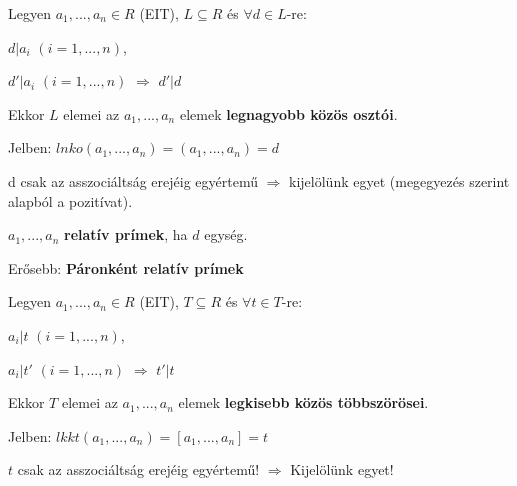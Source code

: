 \begin{frame}
  \begin{tcolorbox}[title={Def.: Legnagyobb közös osztó}]
      Legyen $a_1, ..., a_n \in R$ (EIT), $L \subseteq R $ és ${\forall}d \in L$-re:\\
      \mmedskip

      $d|a_i$ $(i = 1, ..., n)$,\\
      \mmedskip

      $d' | a_i$ $(i = 1, ..., n)$ $\Rightarrow$ $d'|d$\\
      \mmedskip

      Ekkor $L$ elemei az $a_1, ..., a_n$ elemek \textbf{legnagyobb közös osztói}.\\
      \mmedskip

      Jelben: $lnko(a_1, ..., a_n) = (a_1, ..., a_n) = d$\\
      \mmedskip

      d csak az asszociáltság erejéig egyértemű $\Rightarrow$ kijelölünk egyet (megegyezés szerint alapból a pozitívat).
  \end{tcolorbox}

  \begin{tcolorbox}[title={Def.: Relatív prím, Páronként relatív prím}]
    $a_1, ..., a_n$ \textbf{relatív prímek}, ha $d$ egység.\\
    \mmedskip

    Erősebb: \textbf{Páronként relatív prímek}
  \end{tcolorbox}

  \begin{tcolorbox}[title={Def.: Legkisebb közös többszörös}]
      Legyen $a_1, ..., a_n \in R$ (EIT), $T \subseteq R $ és ${\forall}t \in T$-re:\\
      \mmedskip

      $a_i|t$ $(i = 1, ..., n)$,\\
      \mmedskip

      $a_i|t'$ $(i = 1, ..., n)$ $\Rightarrow$ $t'|t$\\
      \mmedskip

      Ekkor $T$ elemei az $a_1, ..., a_n$ elemek \textbf{legkisebb közös többszörösei}.\\
      \mmedskip

      Jelben: $lkkt(a_1, ..., a_n) = [a_1, ..., a_n] = t$\\
      \mmedskip

      $t$ csak az asszociáltság erejéig egyértemű! $\Rightarrow$ Kijelölünk egyet!
  \end{tcolorbox}
\end{frame}

